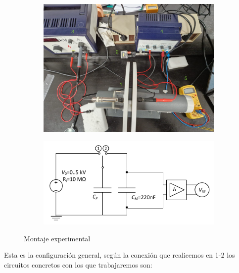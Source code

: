 \documentclass[a4paper,12pt,titlepage]{article}
\begin{document}
\begin{figure}[h!]
    \centering
    \begin{subfigure}{0.45\textwidth}
        \centering
        \includegraphics[width=0.75\linewidth]{materiales1.2-1.jpg}
    \end{subfigure}
    \begin{subfigure}{0.45\textwidth}
        \centering
        \includegraphics[width=1.15\linewidth]{montaje_esquema.png}
    \end{subfigure}
    \caption{Montaje experimental}
    \label{Material}
\end{figure}

Esta es la configuración general, según la conexión que realicemos en 1-2 los circuitos concretos con los que trabajaremos son:
\end{document}
